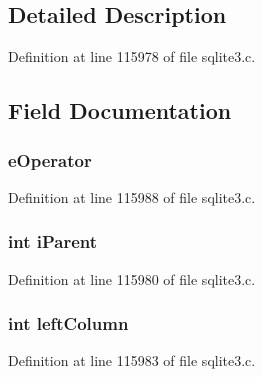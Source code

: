 \subsection{Detailed Description}


Definition at line 115978 of file sqlite3.\+c.



\subsection{Field Documentation}
\hypertarget{struct_where_term_a695bfc96317aa1d79ee883b711da4bc3}{}
\subsubsection[{e\+Operator}]{ e\+Operator}\label{struct_where_term_a695bfc96317aa1d79ee883b711da4bc3}


Definition at line 115988 of file sqlite3.\+c.

\hypertarget{struct_where_term_a247cff41b07e5d14c9ba6650d89a0060}{}
\subsubsection[{i\+Parent}]{\setlength{\rightskip}{0pt plus 5cm}int i\+Parent}\label{struct_where_term_a247cff41b07e5d14c9ba6650d89a0060}


Definition at line 115980 of file sqlite3.\+c.

\hypertarget{struct_where_term_afe35f80ea3d374f6d4c0e62e2153cae1}{}
\subsubsection[{left\+Column}]{\setlength{\rightskip}{0pt plus 5cm}int left\+Column}\label{struct_where_term_afe35f80ea3d374f6d4c0e62e2153cae1}


Definition at line 115983 of file sqlite3.\+c.

\hypertarget{struct_where_term_a5dfdebab7f5ce6a9e8c3985173ed6584}{}
